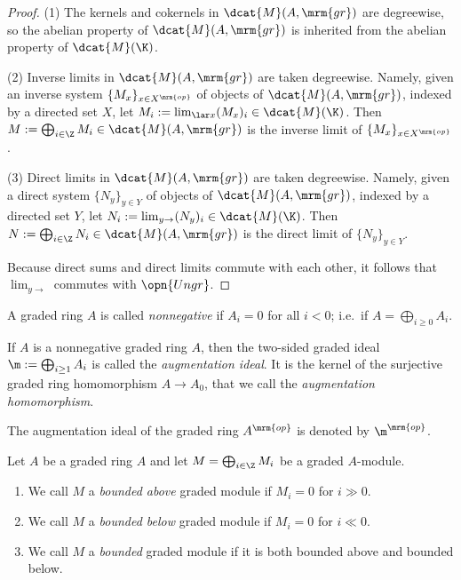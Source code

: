 \begin{proof}
(1) The kernels and cokernels in $\dcat{M}(A, \mrm{gr})$ are degreewise, so the 
abelian property of $\dcat{M}(A, \mrm{gr})$ is inherited from the 
abelian property of $\dcat{M}(\K)$.

\medskip \noindent
(2) Inverse limits in  $\dcat{M}(A, \mrm{gr})$ are taken degreewise. 
Namely, given an inverse system  
$\{ M_x \}_{x \in X^{\mrm{op}}}$ of objects of $\dcat{M}(A, \mrm{gr})$,
indexed by a directed set $X$, let 
$M_i := \lim_{\lar x} (M_x)_i \in \dcat{M}(\K)$.
Then 
$M := \bigoplus_{i \in \Z} M_i \in \dcat{M}(A, \mrm{gr})$
is the inverse limit of $\{ M_x \}_{x \in X^{\mrm{op}}}$.

\medskip \noindent
(3) Direct limits in $\dcat{M}(A, \mrm{gr})$ are taken degreewise. 
Namely, given a direct system  
$\{ N_y \}_{y \in Y}$ of objects of $\dcat{M}(A, \mrm{gr})$,
indexed by a directed set $Y$, let 
$N_i := \lim_{y \to} (N_y)_i \in \dcat{M}(\K)$.
Then 
$N := \bigoplus_{i \in \Z} N_i \in \dcat{M}(A, \mrm{gr})$
is the direct limit of $\{ N_y \}_{y \in Y}$.

Because direct sums and direct limits commute with each other, it follows that 
$\lim_{y \to}$ commutes with $\opn{Ungr}$. 
\end{proof}

\begin{dfn} \label{dfn:4540}
A graded ring $A$  is called {\em nonnegative} 
if $A_i = 0$ for all $i < 0$; i.e.\ if $A = \bigoplus_{i \geq 0} A_i$.

If $A$ is a nonnegative graded ring $A$, then the two-sided graded ideal
$\m :=  \bigoplus_{i \geq 1} A_i$ is called the {\em augmentation ideal}. 
It is the kernel of the surjective graded ring homomorphism $A \to A_0$, that we 
call the {\em augmentation homomorphism}. 

The augmentation ideal of the graded ring $A^{\mrm{op}}$ is denoted by 
$\m^{\mrm{op}}$. 
\end{dfn}

\begin{dfn} \label{dfn:4541}
Let $A$ be a graded ring $A$ and let 
$M = \bigoplus_{i \in \Z} M_i$ be a graded $A$-module.
\begin{enumerate}
\item We call $M$ a {\em bounded above} graded module if $M_i = 0$ for 
$i \gg 0$.

\item We call $M$ a {\em bounded below} graded module if $M_i = 0$ for 
$i \ll 0$.

\item We call $M$ a {\em bounded} graded module if it is both bounded above and 
bounded below.
\end{enumerate}
\end{dfn}


